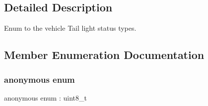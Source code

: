 \subsection{Detailed Description}
Enum to the vehicle Tail light status types. 

\subsection{Member Enumeration Documentation}
\mbox{\label{structmaf__perception__interface_1_1VehicleTailLightEnum_ace587f471fe53b8674bbf9d9633f49fb}} 
\subsubsection{\texorpdfstring{anonymous enum}{anonymous enum}}
{\footnotesize\ttfamily anonymous enum \+: uint8\+\_\+t}

